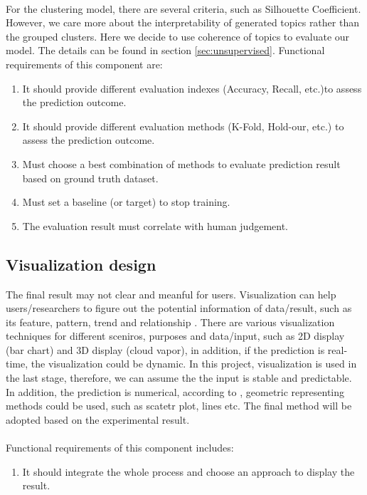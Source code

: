 \\For the clustering model, there are several criteria, such as Silhouette Coefficient. However, we care more about the interpretability of generated topics rather than the grouped clusters. Here we decide to use coherence of topics to evaluate our model. The details can be found in section \ref{sec:unsupervised}.
Functional requirements of this component are:
\begin{enumerate}
    \item It should provide different evaluation indexes (Accuracy, Recall, etc.)to assess the prediction outcome.
    \item It should provide different evaluation methods (K-Fold, Hold-our, etc.) to assess the prediction outcome.
    \item Must choose a best combination of methods to evaluate prediction result based on ground truth dataset.
    \item Must set a baseline (or target) to stop training.
    \item The evaluation result must correlate with human judgement.
\end{enumerate}
\subsection{Visualization design}
The final result may not clear and meanful for users. Visualization can help users/researchers to figure out the potential information of data/result, such as its feature, pattern, trend and relationship \cite{grinstein2002information}. There are various visualization techniques for different sceniros, purposes and data/input, such as 2D display (bar chart) and 3D display (cloud vapor), in addition, if the prediction is real-time, the visualization could be dynamic.  In this project, visualization is used in the last stage, therefore, we can assume the the input is stable and predictable. In addition, the prediction is numerical, according to \cite{grinstein2002information}, geometric representing methods could be used, such as scatetr plot, lines etc. The final method will be adopted based on the experimental result.\\\\
Functional requirements of this component includes:
\begin{enumerate}
    \item It should integrate the whole process and choose an approach to display the result.
\end{enumerate}